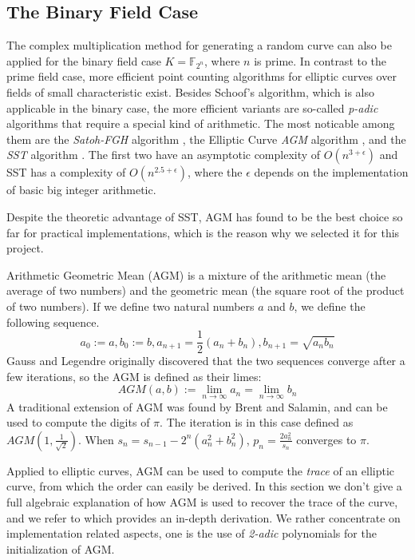 \documentclass[11pt,english]{article}
\begin{document}
\subsection{The Binary Field Case}
The complex multiplication method for generating a random curve can also be applied for the binary field case $K=\mathbb{F}_{2^n}$, where $n$ is prime.
In contrast to the prime field case, more efficient point counting algorithms for elliptic curves over fields of small characteristic exist.
Besides Schoof's algorithm, which is also applicable in the binary case, the more efficient variants are so-called \emph{p-adic} algorithms that require a special kind of arithmetic.
The most noticable among them are the \emph{Satoh-FGH} algorithm \cite{satohfgh}, the Elliptic Curve \emph{AGM} algorithm \cite{717152}\cite{handbook}, and the \emph{SST} algorithm \cite{Satoh200389}.
The first two have an asymptotic complexity of $O(n^{3+\epsilon})$ and SST has a complexity of $O(n^{2.5+\epsilon})$, where the $\epsilon$ depends on the implementation of basic big integer arithmetic.

Despite the theoretic advantage of SST, AGM has found to be the best choice so far for practical implementations, which is the reason why we selected it for this project.

Arithmetic Geometric Mean (AGM) is a mixture of the arithmetic mean (the average of two numbers) and the geometric mean (the square root of the product of two numbers). If we define two natural numbers $a$ and $b$, we define the following sequence.
\begin{displaymath}
 a_0:=a,b_0:=b,a_{n+1}=\frac{1}{2}(a_n+b_n),b_{n+1}=\sqrt{a_nb_n}
\end{displaymath}
Gauss and Legendre originally discovered that the two sequences converge after a few iterations, so the AGM is defined as their limes:
\begin{displaymath}
 AGM(a,b):=\lim_{n\rightarrow \infty} a_n=\lim_{n\rightarrow \infty} b_n
\end{displaymath}
A traditional extension of AGM was found by Brent and Salamin, and can be used to compute the digits of $\pi$. The iteration is in this case defined as $AGM(1,\frac{1}{\sqrt{2}})$. When $s_n=s_{n-1}-2^n(a_n^2+b_n^2)$, $p_n=\frac{2a_n^2}{s_n}$ converges to $\pi$.

Applied to elliptic curves, AGM can be used to compute the \emph{trace} of an elliptic curve, from which the order can easily be derived. In this section we don't give a full algebraic explanation of how AGM is used to recover the trace of the curve, and we refer to \cite{handbook} which provides an in-depth derivation. We rather concentrate on implementation related aspects, one is the use of \emph{2-adic} polynomials for the initialization of AGM.
\end{document}
